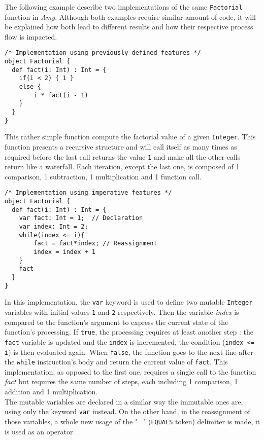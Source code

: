 The following example describe two implementations of the same \texttt{Factorial} function in \textsl{Amy}. Although both examples require similar amount of code, it will be explained how both lead to different results and how their respective process flow is impacted.

\begin{lstlisting}
/* Implementation using previously defined features */
object Factorial {
  def fact(i: Int) : Int = { 
    if(i < 2) { 1 }
    else {
        i * fact(i - 1)
    }
  }
}
\end{lstlisting}
This rather simple function compute the factorial value of a given \texttt{Integer}. This function presents a recursive structure and will call itself as many times as required before the last call returns the value \texttt{1} and make all the other calls return like a waterfall. Each iteration, except the last one, is composed of 1 comparison, 1 subtraction, 1 multiplication and 1 function call.
\newpage
\begin{lstlisting}
/* Implementation using imperative features */
object Factorial {
  def fact(i: Int) : Int = { 
    var fact: Int = 1;  // Declaration
    var index: Int = 2;
    while(index <= i){
        fact = fact*index; // Reassignment
        index = index + 1
    }
    fact    
  } 
}
\end{lstlisting}
In this implementation, the \texttt{var} keyword is used to define two mutable \texttt{Integer} variables with initial values \texttt{1} and \texttt{2} respectively. Then the variable \textsl{index} is compared to the function's argument to express the current state of the function's processing. If \texttt{true}, the processing requires at least another step : the \texttt{fact} variable is updated and the \texttt{index} is incremented, the condition (\texttt{index <= i}) is then evaluated again. When \texttt{false}, the function goes to the next line after the \texttt{while} instruction's body and return the current value of \texttt{fact}.
This implementation, as opposed to the first one, requires a single call to the function \textsl{fact} but requires the same number of steps, each including 1 comparison, 1 addition and 1 multiplication. \\

The mutable variables are declared in a similar way the immutable ones are, using only the keyword \texttt{var} instead. On the other hand, in the reassignment of those variables, a whole new usage of the "=" (\texttt{EQUALS} token) delimiter is made, it is used as an operator.

